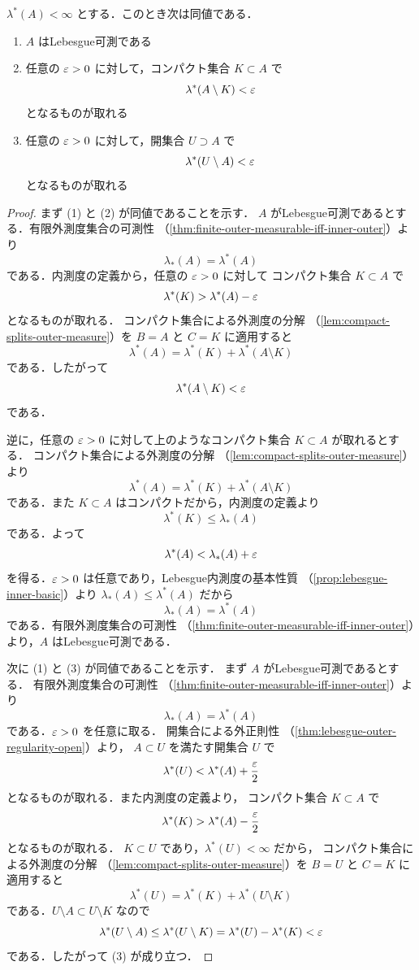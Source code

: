 \begin{lemma}[有限外測度集合の近似判定法]\label{lem:finite-outer-compact-criterion}
$\lambda^*(A)<\infty$ とする．このとき次は同値である．
\begin{enumerate}
    \item $A$ はLebesgue可測である
    \item 任意の $\varepsilon>0$ に対して，コンパクト集合 $K\subset A$ で
    \[
    \lambda^*(A\setminus K)<\varepsilon
    \]
    となるものが取れる
    \item 任意の $\varepsilon>0$ に対して，開集合 $U\supset A$ で
    \[
    \lambda^*(U\setminus A)<\varepsilon
    \]
    となるものが取れる
\end{enumerate}
\end{lemma}
\begin{proof}
まず (1) と (2) が同値であることを示す．
$A$ がLebesgue可測であるとする．有限外測度集合の可測性
（\cref{thm:finite-outer-measurable-iff-inner-outer}）より
\[
\lambda_*(A)=\lambda^*(A)
\]
である．内測度の定義から，任意の $\varepsilon>0$ に対して
コンパクト集合 $K\subset A$ で
\[
\lambda^*(K)>\lambda^*(A)-\varepsilon
\]
となるものが取れる．
コンパクト集合による外測度の分解
（\cref{lem:compact-splits-outer-measure}）を $B=A$ と $C=K$ に適用すると
\[
\lambda^*(A)=\lambda^*(K)+\lambda^*(A\setminus K)
\]
である．したがって
\[
\lambda^*(A\setminus K)<\varepsilon
\]
である．

逆に，任意の $\varepsilon>0$ に対して上のようなコンパクト集合 $K\subset A$ が取れるとする．
コンパクト集合による外測度の分解
（\cref{lem:compact-splits-outer-measure}）より
\[
\lambda^*(A)=\lambda^*(K)+\lambda^*(A\setminus K)
\]
である．また $K\subset A$ はコンパクトだから，内測度の定義より
\[
\lambda^*(K)\le \lambda_*(A)
\]
である．よって
\[
\lambda^*(A)<\lambda_*(A)+\varepsilon
\]
を得る．$\varepsilon>0$ は任意であり，Lebesgue内測度の基本性質
（\cref{prop:lebesgue-inner-basic}）より $\lambda_*(A)\le\lambda^*(A)$ だから
\[
\lambda_*(A)=\lambda^*(A)
\]
である．有限外測度集合の可測性
（\cref{thm:finite-outer-measurable-iff-inner-outer}）より，$A$ はLebesgue可測である．

次に (1) と (3) が同値であることを示す．
まず $A$ がLebesgue可測であるとする．
有限外測度集合の可測性
（\cref{thm:finite-outer-measurable-iff-inner-outer}）より
\[
\lambda_*(A)=\lambda^*(A)
\]
である．$\varepsilon>0$ を任意に取る．
開集合による外正則性
（\cref{thm:lebesgue-outer-regularity-open}）より，
$A\subset U$ を満たす開集合 $U$ で
\[
\lambda^*(U)<\lambda^*(A)+\frac{\varepsilon}{2}
\]
となるものが取れる．また内測度の定義より，
コンパクト集合 $K\subset A$ で
\[
\lambda^*(K)>\lambda^*(A)-\frac{\varepsilon}{2}
\]
となるものが取れる．
$K\subset U$ であり，$\lambda^*(U)<\infty$ だから，
コンパクト集合による外測度の分解
（\cref{lem:compact-splits-outer-measure}）を $B=U$ と $C=K$ に適用すると
\[
\lambda^*(U)=\lambda^*(K)+\lambda^*(U\setminus K)
\]
である．$U\setminus A\subset U\setminus K$ なので
\[
\lambda^*(U\setminus A)
\le
\lambda^*(U\setminus K)
=
\lambda^*(U)-\lambda^*(K)
<
\varepsilon
\]
である．したがって (3) が成り立つ．


\end{proof}
